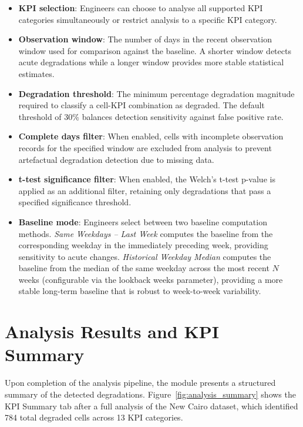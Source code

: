 \begin{itemize}
    \item \textbf{KPI selection}: Engineers can choose to analyse all supported KPI categories simultaneously or restrict analysis to a specific KPI category.

    \item \textbf{Observation window}: The number of days in the recent observation window used for comparison against the baseline. A shorter window detects acute degradations while a longer window provides more stable statistical estimates.

    \item \textbf{Degradation threshold}: The minimum percentage degradation magnitude required to classify a cell-KPI combination as degraded. The default threshold of 30\% balances detection sensitivity against false positive rate.

    \item \textbf{Complete days filter}: When enabled, cells with incomplete observation records for the specified window are excluded from analysis to prevent artefactual degradation detection due to missing data.

    \item \textbf{t-test significance filter}: When enabled, the Welch's t-test p-value is applied as an additional filter, retaining only degradations that pass a specified significance threshold.

    \item \textbf{Baseline mode}: Engineers select between two baseline computation methods. \emph{Same Weekdays -- Last Week} computes the baseline from the corresponding weekday in the immediately preceding week, providing sensitivity to acute changes. \emph{Historical Weekday Median} computes the baseline from the median of the same weekday across the most recent $N$ weeks (configurable via the lookback weeks parameter), providing a more stable long-term baseline that is robust to week-to-week variability.
\end{itemize}

\section{Analysis Results and KPI Summary}

Upon completion of the analysis pipeline, the module presents a structured summary of the detected degradations. Figure~\ref{fig:analysis_summary} shows the KPI Summary tab after a full analysis of the New Cairo dataset, which identified 784 total degraded cells across 13 KPI categories.

